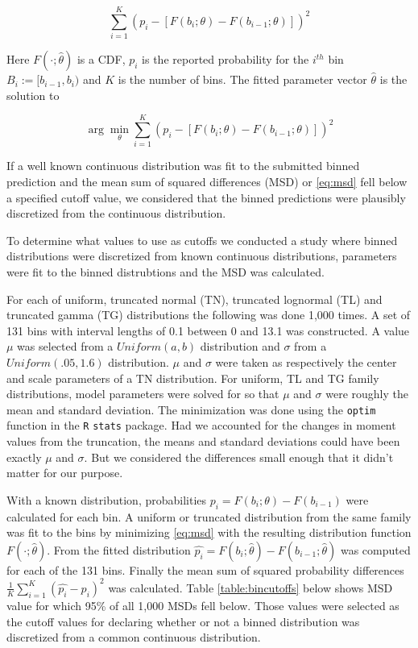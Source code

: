 \documentclass[11pt,notitlepage]{isuthesis}
\begin{document}
\begin{equation}
  \sum_{i=1}^K (p_i - [F(b_i; \theta) - F(b_{i-1}; \theta)])^2
  \label{eq:mds}
\end{equation}

Here $F(\cdot; \hat{\theta})$ is a CDF, $p_i$ is the reported probability for 
the $i^{th}$ bin $B_i := [b_{i-1}, b_i)$ and $K$ is the number of bins.
The fitted parameter vector $\hat{\theta}$ is the solution to 

\begin{equation}
\arg\min_{\theta}\sum_{i=1}^K (p_i - 
[F(b_i; \theta) - F(b_{i-1}; \theta)])^2
\label{eq:discfit}
\end{equation}

If a well known continuous distribution was fit to the submitted binned 
prediction
and the mean sum of squared differences (MSD) or \ref{eq:msd} fell below a 
specified cutoff value, we
considered that the binned predictions were plausibly discretized from the 
continuous distribution.


To determine what values to use as cutoffs we conducted a study where 
binned distributions were discretized from known continuous distributions, 
parameters were fit to the binned distrubtions and the MSD was calculated.

For each of uniform, truncated normal (TN), truncated lognormal (TL) and 
truncated gamma (TG) distributions the following was
done 1,000 times. A set of 131 bins with interval lengths of 
0.1 between 0 and 13.1 was constructed. 
A value $\mu$ was selected from a $Uniform(a,b)$ distribution and $\sigma$ from 
a $Uniform(.05,1.6)$ distribution. $\mu$ and $\sigma$ were taken as respectively 
the center and scale parameters of a TN distribution. 
For uniform, TL and TG family
distributions, model parameters were solved for so that $\mu$ and $\sigma$ 
were roughly the mean and standard deviation. The minimization was done using 
the \texttt{optim} function in the \texttt{R} \texttt{stats} package.
Had we accounted for the changes
in moment values from the truncation, the means and standard deviations could 
have been exactly $\mu$ and $\sigma$. But we considered the differences small 
enough that it didn't matter for our purpose.

With a known distribution, probabilities $p_i =F(b_i; \theta) - F(b_{i-1})$ were
calculated for each bin. A uniform or truncated distribution from the same
family was fit to the bins by minimizing \ref{eq:msd} with the resulting
distribution function $F(\cdot; \hat{\theta})$. From the fitted distribution
$\hat{p_i} = F(b_i; \hat{\theta}) - F(b_{i-1}; \hat{\theta})$ was computed for 
each of the 131 bins. Finally the mean sum of squared probability differences
$\frac{1}{K}\sum_{i=1}^K (\hat{p_i} - p_i)^2$ was calculated. 
Table \ref{table:bincutoffs}
below shows MSD value for which 95\% of all 1,000 MSDs fell below. Those values 
were selected as the 
cutoff values for declaring whether or not a binned distribution was discretized
from a common continuous distribution.
\end{document}
